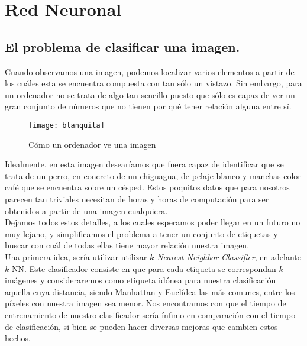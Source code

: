 
\chapter{Red Neuronal}
\section{El problema de clasificar una imagen.}

Cuando observamos una imagen, podemos localizar varios elementos a partir de los cuáles esta se encuentra compuesta con tan sólo un vistazo. Sin embargo, para un ordenador no se trata de algo tan sencillo puesto que sólo es capaz de ver un gran conjunto de números que no tienen por qué tener relación alguna entre sí.\\

\begin{figure}[htpb]
  \centering
  \texttt{[image: blanquita]}
  \caption{Cómo un ordenador ve una imagen}
  \label{fig:blanquita}
\end{figure}

Idealmente, en esta imagen desearíamos que fuera capaz de identificar que se trata de un perro, en concreto de un chiguagua, de pelaje blanco y manchas color café que se encuentra sobre un césped. Estos poquitos datos que para nosotros parecen tan triviales necesitan de horas y horas de computación para ser obtenidos a partir de una imagen cualquiera.\\

Dejamos todos estos detalles, a los cuales esperamos poder llegar en un futuro no muy lejano, y simplificamos el problema a tener un conjunto de etiquetas y buscar con cuál de todas ellas tiene mayor relación nuestra imagen.\\

Una primera idea, sería utilizar utilizar \emph{$k$-Nearest Neighbor Classifier}, en adelante $k$-NN. Este clasificador consiste en que para cada etiqueta se correspondan $k$ imágenes y consideraremos como etiqueta idónea para nuestra clasificación aquella cuya distancia, siendo Manhattan y Euclídea las más comunes, entre los píxeles con nuestra imagen sea menor. Nos encontramos con que el tiempo de entrenamiento de nuestro clasificador sería ínfimo en comparación con el tiempo de clasificación, si bien se pueden hacer diversas mejoras que cambien estos hechos. \\


